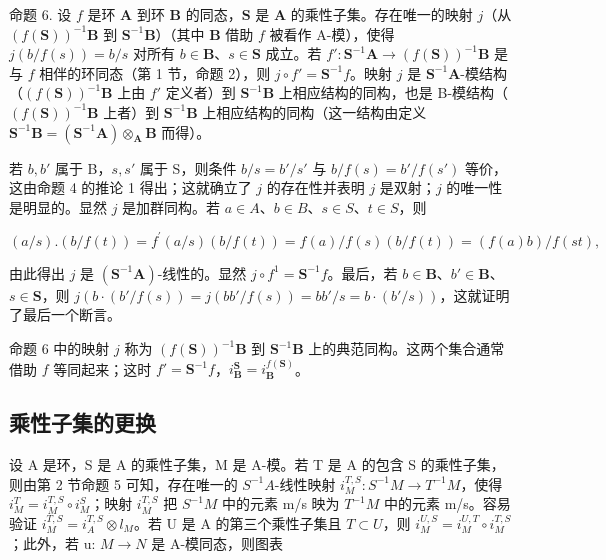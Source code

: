 命题 6. 设 \(f\) 是环 \(\mathbf{A}\) 到环 \(\mathbf{B}\) 的同态，\(\mathbf{S}\) 是 \(\mathbf{A}\) 的乘性子集。存在唯一的映射 \(j\)（从 \((f(\mathbf{S}))^{-1}\mathbf{B}\) 到 \(\mathbf{S}^{-1}\mathbf{B}\)）（其中 \(\mathbf{B}\) 借助 \(f\) 被看作 A-模），使得 \(j(b/f(s)) = b/s\) 对所有 \(b \in \mathbf{B}\)、\(s \in \mathbf{S}\) 成立。若 \(f': \mathbf{S}^{-1}\mathbf{A} \to (f(\mathbf{S}))^{-1}\mathbf{B}\) 是与 \(f\) 相伴的环同态（第 1 节，命题 2），则 \(j \circ f' = \mathbf{S}^{-1}f\)。映射 \(j\) 是 \(\mathbf{S}^{-1}\mathbf{A}\)-模结构（\((f(\mathbf{S}))^{-1}\mathbf{B}\) 上由 \(f'\) 定义者）到 \(\mathbf{S}^{-1}\mathbf{B}\) 上相应结构的同构，也是 B-模结构（\((f(\mathbf{S}))^{-1}\mathbf{B}\) 上者）到 \(\mathbf{S}^{-1}\mathbf{B}\) 上相应结构的同构（这一结构由定义 \(\mathbf{S}^{-1}\mathbf{B} = (\mathbf{S}^{-1}\mathbf{A}) \otimes_{\mathbf{A}} \mathbf{B}\) 而得）。

若 \(b, b'\) 属于 B，\(s, s'\) 属于 S，则条件 \(b / s = b' / s'\) 与 \(b / f(s) = b' / f(s')\) 等价，这由命题 4 的推论 1 得出；这就确立了 \(j\) 的存在性并表明 \(j\) 是双射；\(j\) 的唯一性是明显的。显然 \(j\) 是加群同构。若 \(a \in A\)、\(b \in B\)、\(s \in S\)、\(t \in S\)，则

\[
(a / s). (b / f (t)) = f ^ {\prime} (a / s) (b / f (t)) = f (a) / f (s) (b / f (t)) = (f (a) b) / f (s t),
\]

由此得出 \(j\) 是 \((\mathbf{S}^{-1}\mathbf{A})\)-线性的。显然 \(j \circ f^1 = \mathbf{S}^{-1}f\)。最后，若 \(b \in \mathbf{B}\)、\(b' \in \mathbf{B}\)、\(s \in \mathbf{S}\)，则 \(j(b \cdot (b'/f(s)) = j(bb'/f(s)) = bb'/s = b \cdot (b'/s))\)，这就证明了最后一个断言。

命题 6 中的映射 \(j\) 称为 \((f(\mathbf{S}))^{-1}\mathbf{B}\) 到 \(\mathbf{S}^{-1}\mathbf{B}\) 上的典范同构。这两个集合通常借助 \(f\) 等同起来；这时 \(f' = \mathbf{S}^{-1}f\)，\(i_{\mathbf{B}}^{\mathbf{S}} = i_{\mathbf{B}}^{f(\mathbf{S})}\)。

\subsection{乘性子集的更换}

设 A 是环，S 是 A 的乘性子集，M 是 A-模。若 T 是 A 的包含 S 的乘性子集，则由第 2 节命题 5 可知，存在唯一的 \(S^{-1}A\)-线性映射 \(i_{M}^{T,S}:S^{-1}M\to T^{-1}M\)，使得 \(i_{M}^{T}=i_{M}^{T,S}\circ i_{M}^{S}\)；映射 \(i_{M}^{T,S}\) 把 \(S^{-1}M\) 中的元素 m/s 映为 \(T^{-1}M\) 中的元素 m/s。容易验证 \(i_{M}^{T,S}=i_{A}^{T,S}\otimes l_{M}\)。若 U 是 A 的第三个乘性子集且 \(T\subset U\)，则 \(i_{M}^{U,S}=i_{M}^{U,T}\circ i_{M}^{T,S}\)；此外，若 u: \(M\to N\) 是 A-模同态，则图表

